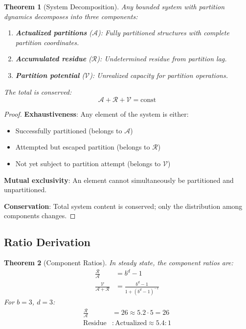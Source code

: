 \documentclass[twocolumn,10pt,a4paper]{article}
\newtheorem{theorem}{Theorem}[section]
\theoremstyle{definition}
\theoremstyle{remark}
\newcommand{\Residue}{\mathcal{R}}
\newcommand{\Potential}{\mathcal{V}}
\begin{document}
\begin{theorem}[System Decomposition]
\label{thm:decomposition}
Any bounded system with partition dynamics decomposes into three components:
\begin{enumerate}
    \item \textbf{Actualized partitions} ($\mathcal{A}$): Fully partitioned structures with complete partition coordinates.
    \item \textbf{Accumulated residue} ($\Residue$): Undetermined residue from partition lag.
    \item \textbf{Partition potential} ($\Potential$): Unrealized capacity for partition operations.
\end{enumerate}
The total is conserved:
\begin{equation}
    \mathcal{A} + \Residue + \Potential = \text{const}
\end{equation}
\end{theorem}

\begin{proof}
\textbf{Exhaustiveness}: Any element of the system is either:
\begin{itemize}
    \item Successfully partitioned (belongs to $\mathcal{A}$)
    \item Attempted but escaped partition (belongs to $\Residue$)
    \item Not yet subject to partition attempt (belongs to $\Potential$)
\end{itemize}

\textbf{Mutual exclusivity}: An element cannot simultaneously be partitioned and unpartitioned.

\textbf{Conservation}: Total system content is conserved; only the distribution among components changes.
\end{proof}

\subsection{Ratio Derivation}

\begin{theorem}[Component Ratios]
\label{thm:ratios}
In steady state, the component ratios are:
\begin{align}
    \frac{\Residue}{\mathcal{A}} &= b^d - 1 \\
    \frac{\Potential}{\mathcal{A} + \Residue} &= \frac{b^d - 1}{1 + (b^d - 1)^{-1}}
\end{align}
For $b = 3$, $d = 3$:
\begin{align}
    \frac{\Residue}{\mathcal{A}} &= 26 \approx 5.2 \cdot 5 = 26 \\
    \text{Residue} &: \text{Actualized} \approx 5.4 : 1
\end{align}
\end{theorem}
\end{document}
